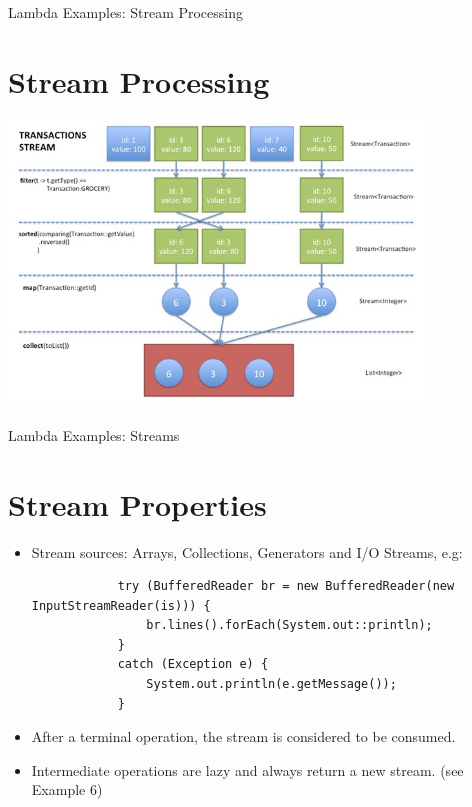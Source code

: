 \documentclass{beamer}
\begin{document}
	\begin{frame}[fragile]{Lambda Examples: Stream Processing}
		\section{Stream Processing}
		
		\includegraphics[width=11cm]{processing}	
		
	\end{frame}	
	
	\begin{frame}[fragile]{Lambda Examples: Streams}
		\section{Stream Properties}
		
		\begin{itemize}
			\item Stream sources: Arrays, Collections, Generators and I/O Streams, e.g:
				
			\begin{lstlisting}
			try (BufferedReader br = new BufferedReader(new InputStreamReader(is))) {
			    br.lines().forEach(System.out::println);
			}
			catch (Exception e) {
			    System.out.println(e.getMessage());
			}
   			\end{lstlisting}
			
			\item After a terminal operation, the stream is considered to be consumed.
			\item Intermediate operations are lazy and always return a new stream. (see Example 6)
				
		\end{itemize}
		
	\end{frame}	
	
\end{document}
